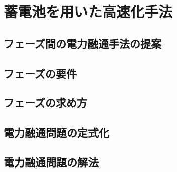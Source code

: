 \chapter{蓄電池を用いた高速化手法}
\label{chap:proposal}



\section{フェーズ間の電力融通手法の提案}
\label{sec:curb}


\section{フェーズの要件}
\label{sec:phase1}


\section{フェーズの求め方}
\label{sec:phase2}


\section{電力融通問題の定式化}
\label{sec:formularization}


\section{電力融通問題の解法}
\label{sec:algorithm}


